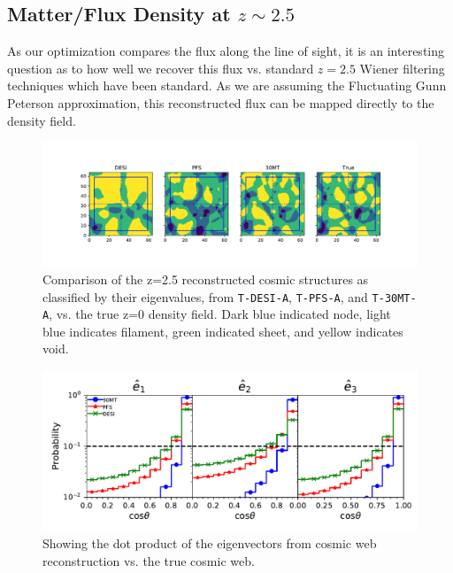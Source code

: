 \documentclass[times]{aastex62}
\begin{document}

\subsection{Matter/Flux Density at $z\sim 2.5$}

As our optimization compares the flux along the line of sight, it is an interesting question as to how well we recover this flux vs. standard $z=2.5$ Wiener filtering techniques which have been standard. As we are assuming the Fluctuating Gunn Peterson approximation, this reconstructed flux can be mapped directly to the density field.


\begin{figure}
  \centering 
  
  \includegraphics[trim=1cm 2cm 0cm 0cm,width=1.0\textwidth]{./figs_treepm/cosmic_structure_z=2.pdf}
    \caption{Comparison of the z=2.5 reconstructed cosmic structures as classified by their eigenvalues, from \texttt{T-DESI-A}, \texttt{T-PFS-A}, and \texttt{T-30MT-A}, vs. the true z=0 density field. Dark blue indicated node, light blue indicates filament, green indicated sheet, and yellow indicates void.} 
    \label{fig_config}
\end{figure}

\begin{figure}
  \centering 
  
  \includegraphics[trim=1cm 0cm 0cm 0cm,width=1.0\textwidth]{./figs_treepm/eigenvectors_z=2.pdf}
    \caption{Showing the dot product of the eigenvectors from cosmic web reconstruction vs. the true cosmic web.} 
    \label{fig_cosmicweb}
\end{figure}
\end{document}
